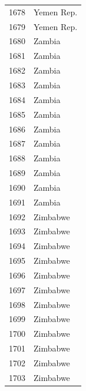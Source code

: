 \documentclass[
  letterpaper,
  DIV=11,
  numbers=noendperiod]{scrreprt}
\begin{document}
\begin{tabular}{ll}
1678 &                Yemen Rep. \\
1679 &                Yemen Rep. \\
1680 &                    Zambia \\
1681 &                    Zambia \\
1682 &                    Zambia \\
1683 &                    Zambia \\
1684 &                    Zambia \\
1685 &                    Zambia \\
1686 &                    Zambia \\
1687 &                    Zambia \\
1688 &                    Zambia \\
1689 &                    Zambia \\
1690 &                    Zambia \\
1691 &                    Zambia \\
1692 &                  Zimbabwe \\
1693 &                  Zimbabwe \\
1694 &                  Zimbabwe \\
1695 &                  Zimbabwe \\
1696 &                  Zimbabwe \\
1697 &                  Zimbabwe \\
1698 &                  Zimbabwe \\
1699 &                  Zimbabwe \\
1700 &                  Zimbabwe \\
1701 &                  Zimbabwe \\
1702 &                  Zimbabwe \\
1703 &                  Zimbabwe \\
\bottomrule
\end{tabular}
\end{document}
